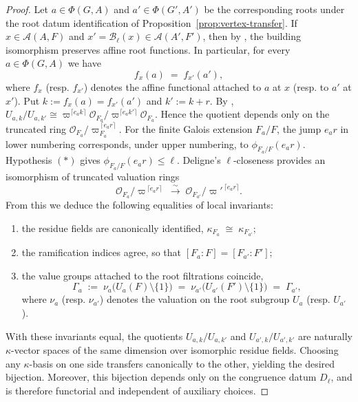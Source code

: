 \documentclass[american]{article}
\numberwithin{equation}{section}
\numberwithin{figure}{section}
\theoremstyle{plain}
\theoremstyle{definition}
\theoremstyle{remark}
\begin{document}
\begin{proof}
Let $a\in\Phi(G,A)$ and $a'\in\Phi(G',A')$ be the corresponding roots under the root datum
identification of Proposition~\ref{prop:vertex-transfer}. If $x\in\mathcal{A}(A,F)$ and
$x'=\mathcal{B}_\ell(x)\in\mathcal{A}(A',F')$, then by \cite[Proposition 4.4]{ganapathy2019}, the building isomorphism preserves affine root functions. In particular, for every $a\in\Phi(G,A)$ we have
\[
   f_x(a) \;=\; f_{x'}(a'),
\]
where $f_x$ (resp. $f_{x'}$) denotes the affine functional attached to $a$ at $x$
(resp. to $a'$ at $x'$).
Put $k:=f_x(a)=f_{x'}(a')$ and $k':=k+r$. By \cite[\S 4.3.2 and \S 4.3.5]{BT84}, $U_{a,k}/U_{a,k'}\cong \varpi^{\lceil e_a k\rceil}\mathcal{O}_{F_a}\big/ \varpi^{\lceil e_a k'\rceil}\mathcal{O}_{F_a}$. Hence the quotient depends only on the truncated ring $\mathcal{O}_{F_a}\big/\varpi_{F_a}^{\,\lceil e_a r\rceil}$.
For the finite Galois extension $F_a/F$, the jump $e_a r$ in lower numbering corresponds, under upper numbering, to $\phi_{F_a/F}(e_a r)$. Hypothesis $(\ast)$ gives $\phi_{F_a/F}(e_a r)\le\ell$. Deligne's $\ell$-closeness provides an isomorphism of truncated valuation rings
\[
   \mathcal{O}_{F_a}\big/\varpi^{\,\lceil e_a r\rceil} \;\xrightarrow{\;\sim\;}\;
   \mathcal{O}_{F_{a'}}\big/\varpi'^{\,\lceil e_a r\rceil}.
\]
From this we deduce the following equalities of local invariants:
\begin{enumerate}[label=(\roman*), leftmargin=2em]
   \item the residue fields are canonically identified, 
   \(\kappa_{F_a}\;\cong\;\kappa_{F_{a'}}\);
   \item the ramification indices agree, so that
   \([F_a:F]=[F_{a'}:F']\);
   \item the value groups attached to the root filtrations coincide,
   \[
      \Gamma_a \;:=\; \nu_a\!\bigl(U_a(F)\setminus\{1\}\bigr)
      \;=\; \nu_{a'}\!\bigl(U_{a'}(F')\setminus\{1\}\bigr)
      \;=\; \Gamma_{a'},
   \]
where $\nu_a$ (resp. $\nu_{a'}$) denotes the valuation on the root subgroup $U_a$ (resp. $U_{a'}$).
\end{enumerate}
With these invariants equal, the quotients
\(U_{a,k}/U_{a,k'}\) and \(U_{a',k}/U_{a',k'}\) are naturally
$\kappa$-vector spaces of the same dimension over isomorphic residue fields. 
Choosing any $\kappa$-basis on one side transfers canonically to the other,
yielding the desired bijection. 
Moreover, this bijection depends only on the congruence datum $D_\ell$,
and is therefore functorial and independent of auxiliary choices.
\end{proof}
\end{document}
